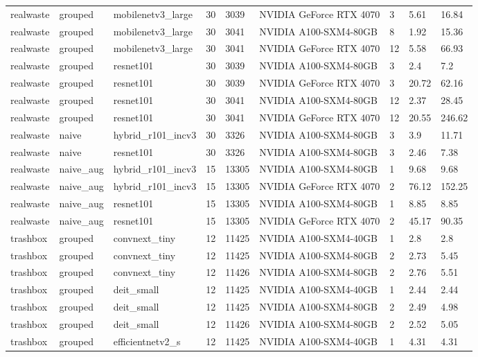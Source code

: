 \begin{table}[ht]
\begin{tabular}{lllllllll}
realwaste & grouped & mobilenetv3\_large & 30 & 3039 & NVIDIA GeForce RTX 4070 & 3 & 5.61 & 16.84 \\
realwaste & grouped & mobilenetv3\_large & 30 & 3041 & NVIDIA A100-SXM4-80GB & 8 & 1.92 & 15.36 \\
realwaste & grouped & mobilenetv3\_large & 30 & 3041 & NVIDIA GeForce RTX 4070 & 12 & 5.58 & 66.93 \\
realwaste & grouped & resnet101 & 30 & 3039 & NVIDIA A100-SXM4-80GB & 3 & 2.4 & 7.2 \\
realwaste & grouped & resnet101 & 30 & 3039 & NVIDIA GeForce RTX 4070 & 3 & 20.72 & 62.16 \\
realwaste & grouped & resnet101 & 30 & 3041 & NVIDIA A100-SXM4-80GB & 12 & 2.37 & 28.45 \\
realwaste & grouped & resnet101 & 30 & 3041 & NVIDIA GeForce RTX 4070 & 12 & 20.55 & 246.62 \\
realwaste & naive & hybrid\_r101\_incv3 & 30 & 3326 & NVIDIA A100-SXM4-80GB & 3 & 3.9 & 11.71 \\
realwaste & naive & resnet101 & 30 & 3326 & NVIDIA A100-SXM4-80GB & 3 & 2.46 & 7.38 \\
realwaste & naive\_aug & hybrid\_r101\_incv3 & 15 & 13305 & NVIDIA A100-SXM4-80GB & 1 & 9.68 & 9.68 \\
realwaste & naive\_aug & hybrid\_r101\_incv3 & 15 & 13305 & NVIDIA GeForce RTX 4070 & 2 & 76.12 & 152.25 \\
realwaste & naive\_aug & resnet101 & 15 & 13305 & NVIDIA A100-SXM4-80GB & 1 & 8.85 & 8.85 \\
realwaste & naive\_aug & resnet101 & 15 & 13305 & NVIDIA GeForce RTX 4070 & 2 & 45.17 & 90.35 \\
trashbox & grouped & convnext\_tiny & 12 & 11425 & NVIDIA A100-SXM4-40GB & 1 & 2.8 & 2.8 \\
trashbox & grouped & convnext\_tiny & 12 & 11425 & NVIDIA A100-SXM4-80GB & 2 & 2.73 & 5.45 \\
trashbox & grouped & convnext\_tiny & 12 & 11426 & NVIDIA A100-SXM4-80GB & 2 & 2.76 & 5.51 \\
trashbox & grouped & deit\_small & 12 & 11425 & NVIDIA A100-SXM4-40GB & 1 & 2.44 & 2.44 \\
trashbox & grouped & deit\_small & 12 & 11425 & NVIDIA A100-SXM4-80GB & 2 & 2.49 & 4.98 \\
trashbox & grouped & deit\_small & 12 & 11426 & NVIDIA A100-SXM4-80GB & 2 & 2.52 & 5.05 \\
trashbox & grouped & efficientnetv2\_s & 12 & 11425 & NVIDIA A100-SXM4-40GB & 1 & 4.31 & 4.31 \\

\end{tabular}
\end{table}
